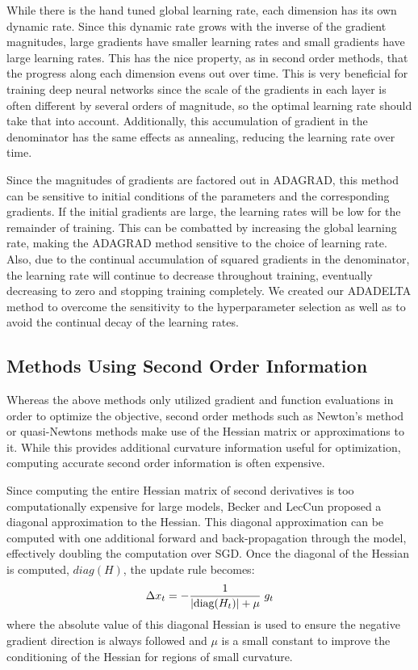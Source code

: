 \documentclass{article}
\def\BE{\vspace{-2.0mm}\begin{equation}}
\def\EE{\vspace{-1.4mm}\end{equation}}
\begin{document}
While there is the hand tuned global learning rate, each dimension has its own dynamic rate. Since
this dynamic rate grows with the inverse of the gradient magnitudes, large gradients have smaller
learning rates and
small gradients have large learning rates. This has the nice property, as in second order methods,
that the progress along each dimension evens out over time. This is very beneficial for training
deep neural networks since the scale of the gradients in each layer is often different by several
orders of magnitude, so the optimal learning rate should take that into account. Additionally, this
accumulation of gradient in the denominator has the same effects as annealing, reducing the learning
rate over time.

Since the magnitudes of gradients are factored out in ADAGRAD, this method can be sensitive to
initial conditions of the parameters and the corresponding gradients. If the initial gradients are
large, the learning rates will be low for the remainder of training.
This can be combatted by increasing the global learning rate, making the ADAGRAD method sensitive to
the choice of learning rate. Also, due to the continual accumulation of
squared gradients in the denominator, the learning rate will continue to decrease throughout
training, eventually decreasing to zero and stopping training completely.
We created our ADADELTA method to overcome the sensitivity to the hyperparameter selection as well
as to avoid the continual decay of the learning rates.

\subsection{Methods Using Second Order Information}
Whereas the above methods only utilized gradient and function evaluations in order to optimize the
objective, second order methods such as Newton's method or quasi-Newtons methods make use of the
Hessian matrix or approximations to it. While this provides additional curvature information useful
for optimization, computing accurate second order information is often expensive.

Since computing the entire Hessian matrix of second derivatives is too
computationally expensive for large models, Becker and LecCun \cite{becker1988} proposed a diagonal
approximation to the Hessian. This diagonal approximation can be computed with one additional
forward and back-propagation through the model, effectively doubling the computation over
SGD. Once the diagonal of the Hessian is computed, $diag(H)$, the update rule becomes:
\BE
\Delta x_t = - \frac{1}{|\text{diag}(H_t)| + \mu} \; g_t
\EE
where the absolute value of this diagonal Hessian is used to ensure the negative gradient direction is always
followed and $\mu$ is a small constant to improve the conditioning of the Hessian for regions of
small curvature.
\end{document}
